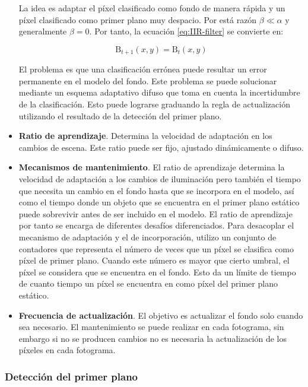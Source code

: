\begin{itemize}
    La idea es adaptar el píxel clasificado como fondo de manera rápida y un píxel clasificado como primer plano muy despacio. Por está razón $\beta \ll \alpha$ y generalmente $\beta = 0$. Por tanto, la ecuación \ref{eq:IIR-filter} se convierte en:
    
    \begin{equation}
    \label{eq:IIR-filter2}
    \text{B}_{t+1}(x,y) = \text{B}_{t}(x,y)
    \end{equation}
    
    El problema es que una clasificación errónea puede resultar un error permanente en el modelo del fondo. Este problema se puede solucionar mediante un esquema adaptativo difuso que toma en cuenta la incertidumbre de la clasificación. Esto puede lograrse graduando la regla de actualización utilizando el resultado de la detección del primer plano.
    
    \item \textbf{Ratio de aprendizaje}. Determina la velocidad de adaptación en los cambios de escena. Este ratio puede ser fijo, ajustado dinámicamente o difuso.
    \item \textbf{Mecanismos de mantenimiento}. El ratio de aprendizaje determina la velocidad de adaptación a los cambios de iluminación pero también el tiempo que necesita un cambio en el fondo hasta que se incorpora en el modelo, así como el tiempo donde un objeto que se encuentra en el primer plano estático puede sobrevivir antes de ser incluido en el modelo. El ratio de aprendizaje por tanto se encarga de diferentes desafíos diferenciados. Para desacoplar el mecanismo de adaptación y el de incorporación, \cite{1415580} utilizo un conjunto de contadores que representa el número de veces que un píxel se clasifica como píxel de primer plano. Cuando este número es mayor que cierto umbral, el píxel se considera que se encuentra en el fondo. Esto da un límite de tiempo de cuanto tiempo un píxel se encuentra en como píxel del primer plano estático.
    \item \textbf{Frecuencia de actualización}. El objetivo es actualizar el fondo solo cuando sea necesario. El mantenimiento se puede realizar en cada fotograma, sin embargo si no se producen cambios no es necesaria la actualización de los píxeles en cada fotograma.
\end{itemize}

\subsubsection*{Detección del primer plano}
\label{subsubsec:detección-primer-plano}

